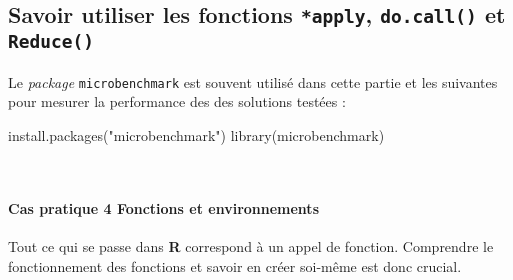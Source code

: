 \documentclass[12pt,]{article}
\newenvironment{Shaded}{}{}
\newcommand{\KeywordTok}[1]{\textcolor[rgb]{0.00,0.00,1.00}{{#1}}}
\newcommand{\StringTok}[1]{\textcolor[rgb]{0.00,0.50,0.50}{{#1}}}
\newcommand{\NormalTok}[1]{{#1}}
\let\oldparagraph\paragraph
\renewcommand{\paragraph}[1]{\oldparagraph{#1}\mbox{}}
\begin{document}
\subsection{\texorpdfstring{Savoir utiliser les fonctions
\texttt{*apply}, \texttt{do.call()} et
\texttt{Reduce()}}{Savoir utiliser les fonctions *apply, do.call() et Reduce()}}\label{savoir-utiliser-les-fonctions-apply-do.call-et-reduce}

Le \emph{package} \texttt{microbenchmark} est souvent utilisé dans cette
partie et les suivantes pour mesurer la performance des des solutions
testées :

\begin{Shaded}
\begin{Highlighting}[]
\KeywordTok{install.packages}\NormalTok{(}\StringTok{"microbenchmark"}\NormalTok{)}
\KeywordTok{library}\NormalTok{(microbenchmark)}
\end{Highlighting}
\end{Shaded}

~

\paragraph{\texorpdfstring{\textbf{Cas pratique 4} Fonctions et
environnements}{Cas pratique 4 Fonctions et environnements}}\label{cas-pratique-4-fonctions-et-environnements}

Tout ce qui se passe dans \textbf{R} correspond à un appel de fonction.
Comprendre le fonctionnement des fonctions et savoir en créer soi-même
est donc crucial.
\end{document}
